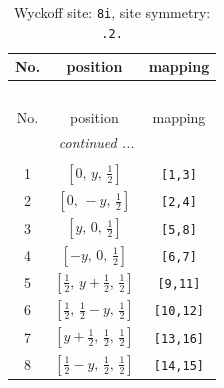 \documentclass[fleqn,8pt]{jsarticle}
\begin{document}
\renewcommand{\arraystretch}{1.2}
\begin{longtable}{ccc}
\caption{Wyckoff site: {\tt 8i}, site symmetry: {\tt .2.}}
 \\
 \hline \hline
No. & position & mapping \\ \hline \endfirsthead

\multicolumn{2}{l}{\tablename\ \thetable{}} \\
 \hline \hline
No. & position & mapping \\ \hline \endhead

 \hline \hline
\multicolumn{2}{r}{\footnotesize\it continued ...} \\ \endfoot

 \hline \hline
\multicolumn{2}{r}{} \\ \endlastfoot

1 & $\left[ 0,\, y,\, \frac{1}{2} \right]$ & {\tt [1,3]} \\ \hline
2 & $\left[ 0,\, - y,\, \frac{1}{2} \right]$ & {\tt [2,4]} \\ \hline
3 & $\left[ y,\, 0,\, \frac{1}{2} \right]$ & {\tt [5,8]} \\ \hline
4 & $\left[ - y,\, 0,\, \frac{1}{2} \right]$ & {\tt [6,7]} \\ \hline
5 & $\left[ \frac{1}{2},\, y + \frac{1}{2},\, \frac{1}{2} \right]$ & {\tt [9,11]} \\ \hline
6 & $\left[ \frac{1}{2},\, \frac{1}{2} - y,\, \frac{1}{2} \right]$ & {\tt [10,12]} \\ \hline
7 & $\left[ y + \frac{1}{2},\, \frac{1}{2},\, \frac{1}{2} \right]$ & {\tt [13,16]} \\ \hline
8 & $\left[ \frac{1}{2} - y,\, \frac{1}{2},\, \frac{1}{2} \right]$ & {\tt [14,15]} \\
\end{longtable}
\renewcommand{\arraystretch}{1.2}
\end{document}
